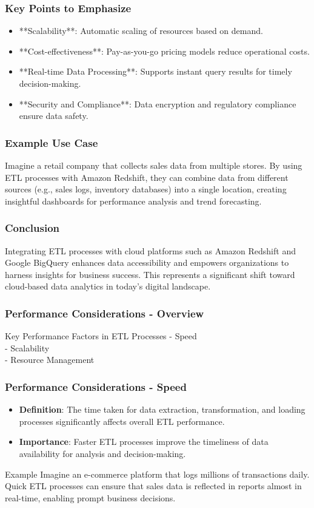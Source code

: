 \documentclass[aspectratio=169]{beamer}
\begin{document}
\begin{frame}[fragile]
    \frametitle{Key Points to Emphasize}
    \begin{itemize}
        \item **Scalability**: Automatic scaling of resources based on demand.
        \item **Cost-effectiveness**: Pay-as-you-go pricing models reduce operational costs.
        \item **Real-time Data Processing**: Supports instant query results for timely decision-making.
        \item **Security and Compliance**: Data encryption and regulatory compliance ensure data safety.
    \end{itemize}
\end{frame}

\begin{frame}[fragile]
    \frametitle{Example Use Case}
    Imagine a retail company that collects sales data from multiple stores. By using ETL processes with Amazon Redshift, they can combine data from different sources (e.g., sales logs, inventory databases) into a single location, creating insightful dashboards for performance analysis and trend forecasting.
\end{frame}

\begin{frame}[fragile]
    \frametitle{Conclusion}
    Integrating ETL processes with cloud platforms such as Amazon Redshift and Google BigQuery enhances data accessibility and empowers organizations to harness insights for business success. This represents a significant shift toward cloud-based data analytics in today’s digital landscape.
\end{frame}

\begin{frame}[fragile]
    \frametitle{Performance Considerations - Overview}
    \begin{block}{Key Performance Factors in ETL Processes}
        - Speed\\
        - Scalability\\
        - Resource Management
    \end{block}
\end{frame}

\begin{frame}[fragile]
    \frametitle{Performance Considerations - Speed}
    \begin{itemize}
        \item \textbf{Definition}: The time taken for data extraction, transformation, and loading processes significantly affects overall ETL performance.
        \item \textbf{Importance}: Faster ETL processes improve the timeliness of data availability for analysis and decision-making.
    \end{itemize}
    \begin{block}{Example}
        Imagine an e-commerce platform that logs millions of transactions daily. Quick ETL processes can ensure that sales data is reflected in reports almost in real-time, enabling prompt business decisions.
    \end{block}
\end{frame}
\end{document}
